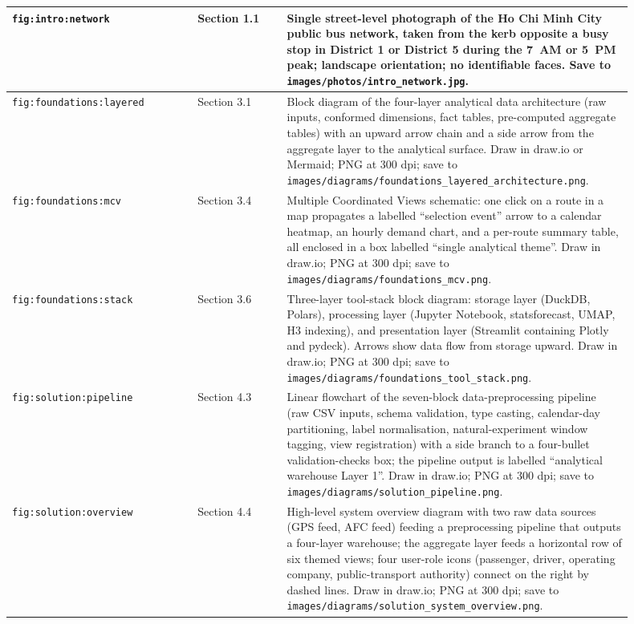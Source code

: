 \begin{longtable}{p{0.27\linewidth} p{0.13\linewidth} p{0.50\linewidth}}
\texttt{fig:intro:network} & Section 1.1 & Single street-level photograph of the Ho Chi Minh City public bus network, taken from the kerb opposite a busy stop in District 1 or District 5 during the 7~AM or 5~PM peak; landscape orientation; no identifiable faces. Save to \texttt{images/photos/\linebreak intro\_network.jpg}. \\
\hline
\texttt{fig:foundations:layered} & Section 3.1 & Block diagram of the four-layer analytical data architecture (raw inputs, conformed dimensions, fact tables, pre-computed aggregate tables) with an upward arrow chain and a side arrow from the aggregate layer to the analytical surface. Draw in draw.io or Mermaid; PNG at 300 dpi; save to \texttt{images/diagrams/\linebreak foundations\_layered\_architecture.png}. \\
\hline
\texttt{fig:foundations:mcv} & Section 3.4 & Multiple Coordinated Views schematic: one click on a route in a map propagates a labelled ``selection event'' arrow to a calendar heatmap, an hourly demand chart, and a per-route summary table, all enclosed in a box labelled ``single analytical theme''. Draw in draw.io; PNG at 300 dpi; save to \texttt{images/diagrams/\linebreak foundations\_mcv.png}. \\
\hline
\texttt{fig:foundations:stack} & Section 3.6 & Three-layer tool-stack block diagram: storage layer (DuckDB, Polars), processing layer (Jupyter Notebook, statsforecast, UMAP, H3 indexing), and presentation layer (Streamlit containing Plotly and pydeck). Arrows show data flow from storage upward. Draw in draw.io; PNG at 300 dpi; save to \texttt{images/diagrams/\linebreak foundations\_tool\_stack.png}. \\
\hline
\texttt{fig:solution:pipeline} & Section 4.3 & Linear flowchart of the seven-block data-preprocessing pipeline (raw CSV inputs, schema validation, type casting, calendar-day partitioning, label normalisation, natural-experiment window tagging, view registration) with a side branch to a four-bullet validation-checks box; the pipeline output is labelled ``analytical warehouse Layer 1''. Draw in draw.io; PNG at 300 dpi; save to \texttt{images/diagrams/\linebreak solution\_pipeline.png}. \\
\hline
\texttt{fig:solution:overview} & Section 4.4 & High-level system overview diagram with two raw data sources (GPS feed, AFC feed) feeding a preprocessing pipeline that outputs a four-layer warehouse; the aggregate layer feeds a horizontal row of six themed views; four user-role icons (passenger, driver, operating company, public-transport authority) connect on the right by dashed lines. Draw in draw.io; PNG at 300 dpi; save to \texttt{images/diagrams/\linebreak solution\_system\_overview.png}. \\

\end{longtable}

